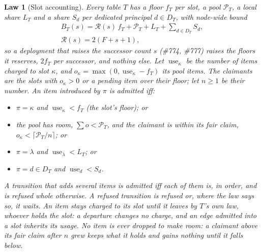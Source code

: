 \documentclass[journal]{IEEEtran}
\newtheorem{law}{Law}
\newcommand{\Rg}{\mathcal{R}}
\newcommand{\Pool}{\mathcal{P}}
\newcommand{\use}{\operatorname{use}}
\newcommand{\issue}[1]{\#{#1}}
\begin{document}
\begin{law}[Slot accounting]\label{law:edge}
Every table $T$ has a floor $f_T$ per slot, a pool $\Pool_T$, a local share $L_T$ and a share
$S_d$ per dedicated principal $d\in D_T$, with node-wide bound
\begin{gather*}
B_T(s)=\Rg(s)\, f_T+\Pool_T+L_T+\textstyle\sum_{d\in D_T}S_d,\\
\Rg(s)=2(F+s+1),
\end{gather*}
so a deployment that raises the successor count $s$ (\issue{774}, \issue{777}) raises the floors
it reserves, $2f_T$ per successor, and nothing else.  Let $\use_\kappa$ be the number of items
charged to slot $\kappa$, and $o_\kappa=\max(0,\use_\kappa-f_T)$ its pool items.  The
\emph{claimants} are the slots with $o_\kappa>0$ or a pending item over their floor; let
$n\ge1$ be their number.  An item introduced by $\pi$ is admitted iff:
\begin{itemize}[leftmargin=1.2em]
\item $\pi=\kappa$ and $\use_\kappa<f_T$ (the slot's floor); or
\item the pool has room, $\sum o<\Pool_T$, and the claimant is within its fair claim,
$o_\kappa<\lceil\Pool_T/n\rceil$; or
\item $\pi=\lambda$ and $\use_\lambda<L_T$; or
\item $\pi=d\in D_T$ and $\use_d<S_d$.
\end{itemize}
A transition that adds several items is admitted iff each of them is, in order, and is refused
whole otherwise.  A refused transition is refused or, where the law says so, it waits.  An item stays charged to its slot
until it leaves by $T$'s own law, whoever holds the slot: a departure changes no charge, and an
edge admitted into a slot inherits its usage.  No item is ever dropped to make room: a claimant
above its fair claim after $n$ grew keeps what it holds and gains nothing until it falls below.
\end{law}
\end{document}
